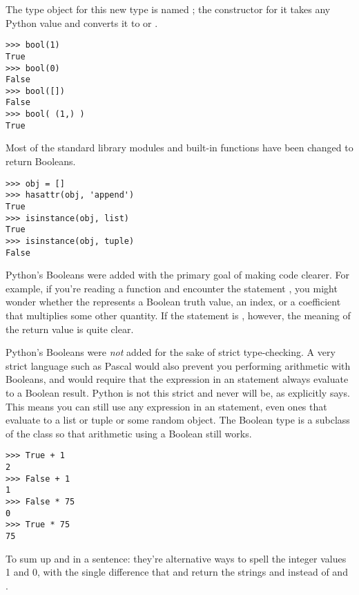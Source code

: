 \documentclass{howto}
\begin{document}
The type object for this new type is named
; the constructor for it takes any Python value and
converts it to  or .

\begin{verbatim}
>>> bool(1)
True
>>> bool(0)
False
>>> bool([])
False
>>> bool( (1,) )
True
\end{verbatim}

Most of the standard library modules and built-in functions have been
changed to return Booleans.

\begin{verbatim}
>>> obj = []
>>> hasattr(obj, 'append')
True
>>> isinstance(obj, list)
True
>>> isinstance(obj, tuple)
False
\end{verbatim}

Python's Booleans were added with the primary goal of making code
clearer.  For example, if you're reading a function and encounter the
statement , you might wonder whether the 
represents a Boolean truth value, an index, or a
coefficient that multiplies some other quantity.  If the statement is
, however, the meaning of the return value is quite
clear.

Python's Booleans were \emph{not} added for the sake of strict
type-checking.  A very strict language such as Pascal would also
prevent you performing arithmetic with Booleans, and would require
that the expression in an  statement always evaluate to a
Boolean result.  Python is not this strict and never will be, as
 explicitly says.  This means you can still use any
expression in an  statement, even ones that evaluate to a
list or tuple or some random object.  The Boolean type is a
subclass of the  class so that arithmetic using a Boolean
still works.

\begin{verbatim}
>>> True + 1
2
>>> False + 1
1
>>> False * 75
0
>>> True * 75
75
\end{verbatim}

To sum up  and  in a sentence: they're
alternative ways to spell the integer values 1 and 0, with the single
difference that  and  return the
strings  and  instead of  and
.

\begin{seealso}


\end{seealso}
\end{document}
